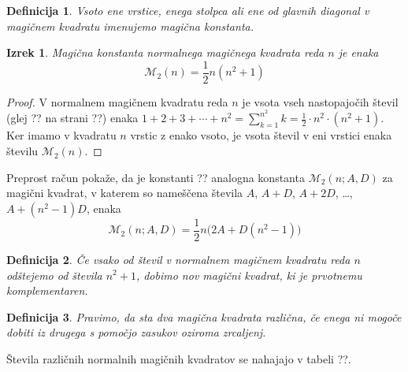 \documentclass[a4paper,12pt]{article}
\newtheorem{definicija}{Definicija}
\newtheorem{izrek}{Izrek}
\newcommand{\m}{\mathcal{M}_2}
\begin{document}
\begin{definicija}
      Vsoto ene vrstice, enega stolpca ali ene od glavnih diagonal
      v magičnem kvadratu imenujemo \emph{magična konstanta}.
\end{definicija}



\begin{izrek}
      Magična konstanta normalnega magičnega kvadrata reda \(n\)
      je enaka
      \begin{equation}
         \m(n)=\frac{1}{2}n(n^2+1)
      \end{equation}
\end{izrek}



   
\begin{proof}
      V normalnem magičnem kvadratu reda \(n\) je vsota vseh nastopajočih
      števil (glej ?? na strani ??) enaka
      \(1+2+3+\cdots +n^2=\sum_{k=1}^{n^2}k=\frac{1}{2}\cdot n^2\cdot(n^2+1)\). Ker imamo
      v kvadratu \(n\) vrstic z enako vsoto, je vsota števil v eni vrstici
      enaka številu \(\m(n)\). %
\end{proof}
Preprost račun pokaže, da je konstanti ?? analogna konstanta
\(\m(n;A,D)\) za magični kvadrat, v katerem so nameščena števila
\(A\), \(A+D\), \(A+2D\), \ldots, \(A+(n^2-1)D\), enaka %
\begin{equation}
\mathcal{M}_2(n;A,D)=\frac{1}{2}n\Big(2A+D(n^2-1)\Big)
\end{equation}

\begin{definicija}
      Če vsako od števil v normalnem magičnem kvadratu reda \(n\) odštejemo
      od števila \(n^2+1\), dobimo nov magični kvadrat, ki je prvotnemu
      \emph{komplementaren}.
\end{definicija}

\begin{definicija}
      Pravimo, da sta dva magična kvadrata \emph{različna}, če enega ni mogoče dobiti
      iz drugega s pomočjo zasukov oziroma zrcaljenj.
\end{definicija}

Števila različnih normalnih magičnih kvadratov se nahajajo v tabeli ??.

     
\end{document}

